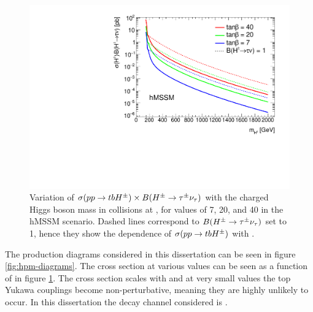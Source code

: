 	\begin{figure}[!ht]
		\centering
		\includegraphics[width=0.75\linewidth]{chapters/chapter2_theory/images/XSBR_hmssm.pdf}
		\caption{\label{fig:hpm-xsec} Variation of $\sigma(pp \to tbH^{\pm}) \times B(H^{\pm} \to \tau^{\pm} \nu_{\tau})$ with the charged Higgs boson mass in \pp collisions at \sqs, for \tanb values of 7, 20, and 40 in the hMSSM scenario. Dashed lines correspond to $B(H^{\pm} \to \tau^{\pm} \nu_{\tau})$ set to 1, hence they show the dependence of $\sigma(pp \to tbH^{\pm})$ with \mHpm. \cite{hpm-previous} }
	\end{figure}
	The production diagrams considered in this dissertation can be seen in figure \ref{fig:hpm-diagrams}. The cross section at various \tanb values can be seen as a function of \mHpm in figure \ref{fig:hpm-xsec}. The cross section scales with \tanb and at very small values the top Yukawa couplings become non-perturbative, meaning they are highly unlikely to occur. In this dissertation the decay channel considered is \HpmLong. 
